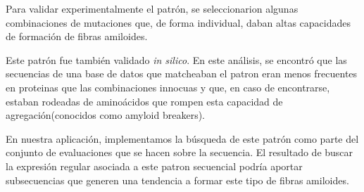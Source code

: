 % 



Para validar experimentalmente el patrón, se seleccionarion algunas combinaciones de mutaciones que, de forma individual, daban altas capacidades de formación de fibras amiloides. 

Este patrón fue también validado \textit{in silico}. En este análisis, se encontró que las secuencias de una base de datos que matcheaban el patron eran menos frecuentes en proteinas que las combinaciones innocuas y que, en caso de encontrarse, estaban rodeadas de aminoácidos que 
rompen esta capacidad de agregación(conocidos como amyloid breakers).



En nuestra aplicación, implementamos la búsqueda de este patrón como parte del conjunto de evaluaciones que se hacen sobre la secuencia. El resultado de buscar la expresión regular asociada a este patron secuencial podría aportar subsecuencias
que generen una tendencia a formar este tipo de fibras amiloides.





